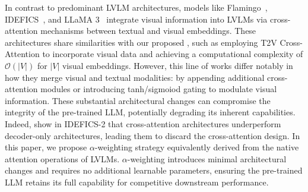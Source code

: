 In contrast to predominant LVLM architectures, models like Flamingo~\citep{flamingo,awadalla2023openflamingo}, IDEFICS~\citep{laurenccon2024obelics}, and LLaMA 3~\citep{dubey2024llama} integrate visual information into LVLMs via cross-attention mechanisms between textual and visual embeddings.
These architectures share similarities with our proposed \method{}, such as employing T2V Cross-Attention to incorporate visual data and achieving a computational complexity of $\mathcal{O}(|V|)$ for $|V|$ visual embeddings.
However, this line of works differ notably in how they merge visual and textual modalities: by appending additional cross-attention modules or introducing tanh/sigmoiod gating to modulate visual information.
These substantial architectural changes can compromise the integrity of the pre-trained LLM, potentially degrading its inherent capabilities.
Indeed, \cite{laurenccon2024matters} show in IDEFICS-2 that cross-attention architectures underperform decoder-only architectures, leading them to discard the cross-attention design.
In this paper, we propose $\alpha$-weighting strategy equivalently derived from the native attention operations of LVLMs.
$\alpha$-weighting introduces minimal architectural changes and requires no additional learnable parameters, ensuring the pre-trained LLM retains its full capability for competitive downstream performance.



